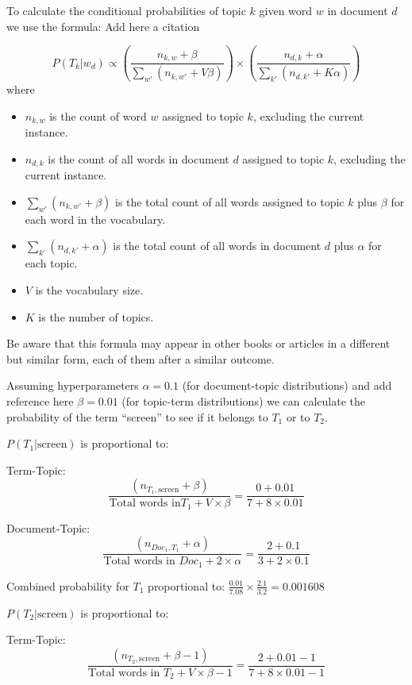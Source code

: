 To calculate the conditional probabilities of topic \(k\) given word
\(w\) in document \(d\) we use the formula: Add here a citation

\[
P(T_k|w_d) \propto \left(\frac{n_{k,w}+\beta}{\sum_{w'}(n_{k,w'}+V\beta)} \right) \times \left(\frac{n_{d,k}+\alpha}{\sum_{k'}(n_{d,k'}+K\alpha)}\right) 
\] where

\begin{itemize}
\tightlist
\item
  \(n_{k,w}\) is the count of word \(w\) assigned to topic \(k\),
  excluding the current instance.
\item
  \(n_{d,k}\) is the count of all words in document \(d\) assigned to
  topic \(k\), excluding the current instance.
\item
  \(\sum_{w'}(n_{k,w'}+\beta)\) is the total count of all words assigned
  to topic \(k\) plus \(\beta\) for each word in the vocabulary.
\item
  \(\sum_{k'}(n_{d,k'}+\alpha)\) is the total count of all words in
  document \(d\) plus \(\alpha\) for each topic.
\item
  \(V\) is the vocabulary size.\\
\item
  \(K\) is the number of topics.
\end{itemize}

Be aware that this formula may appear in other books or
articles in a different but similar form, each of them after a similar
outcome.

Assuming hyperparameters \(\alpha = 0.1\) (for document-topic
distributions) and add reference here \(\beta = 0.01\) (for topic-term distributions) we can
calculate the probability of the term ``screen'' to see if it belongs to
\(T_1\) or to \(T_2\).

\(P(T_1 |\text{screen})\) is proportional to:

Term-Topic:
\[\frac{(n_{T_1,\text{screen}} +\beta)}{\text{Total words in} T_1 + V\times \beta} = \frac{0+0.01}{7+8\times 0.01} \]

Document-Topic:
\[\frac{(n_{Doc_1,T_1} +\alpha)}{\text{Total words in }Doc_1 + 2 \times \alpha} = \frac{2+0.1}{3+2\times 0.1} \]

Combined probability for \(T_1\) proportional to:
\(\frac{0.01}{7.08}\times\frac{2.1}{3.2}=0.001608\)

\(P(T_2 |\text{screen})\) is proportional to:

Term-Topic:
\[\frac{(n_{T_2, \text{screen}} +\beta -1)}{\text{Total words in } T_2 + V\times \beta -1} = \frac{2+0.01-1}{7+8\times 0.01-1} \]


